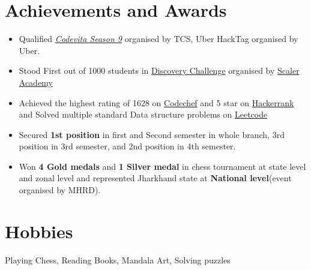 \documentclass[margin, centered]{res}
\begin{document}
\begin{resume}
\section{Achievements and Awards}
\begin{itemize}[leftmargin=*]
 \item Qualified  \href{https://drive.google.com/file/d/16OY0sqsJXUs4BXPSdkCaoF_2f4SIdxKI/view?usp=sharing}{\emph{Codevita Season 9}} organised by TCS, Uber HackTag organised by Uber.
 \item Stood First out of 1000 students in  \href{https://drive.google.com/file/d/1IO5cW3NQkcZCm8p65HSRLOaKHfI16ZbS/view?usp=sharing}{Discovery Challenge} organised by \href{https://www.scaler.com/}{Scaler Academy}
 \item Achieved the highest rating of 1628 on \href{https://www.codechef.com/users/tannu_kumari}{Codechef} and 5 star on \href {https://www.hackerrank.com/tannuchoudhary10}{Hackerrank} and Solved multiple standard Data structure problems on \href{https://leetcode.com/tannu_kumari/}{Leetcode}
 \item Secured \textbf{1st position} in first and Second semester in whole branch, 3rd position in 3rd semester, and 2nd position in 4th semester.
 \item Won \textbf{4 Gold medals} and \textbf{1 Silver medal} in chess tournament at state level and zonal level and represented Jharkhand state at \textbf{National level}(event organised by MHRD).
\end{itemize}



\section{Hobbies}
Playing Chess, Reading Books, Mandala Art, Solving puzzles


\end{resume}
\end{document}
